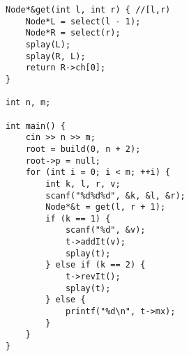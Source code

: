 \begin{verbatim}
Node*&get(int l, int r) { //[l,r)
    Node*L = select(l - 1);
    Node*R = select(r);
    splay(L);
    splay(R, L);
    return R->ch[0];
}

int n, m;

int main() {
    cin >> n >> m;
    root = build(0, n + 2);
    root->p = null;
    for (int i = 0; i < m; ++i) {
        int k, l, r, v;
        scanf("%d%d%d", &k, &l, &r);
        Node*&t = get(l, r + 1);
        if (k == 1) {
            scanf("%d", &v);
            t->addIt(v);
            splay(t);
        } else if (k == 2) {
            t->revIt();
            splay(t);
        } else {
            printf("%d\n", t->mx);
        }
    }
}
\end{verbatim}
